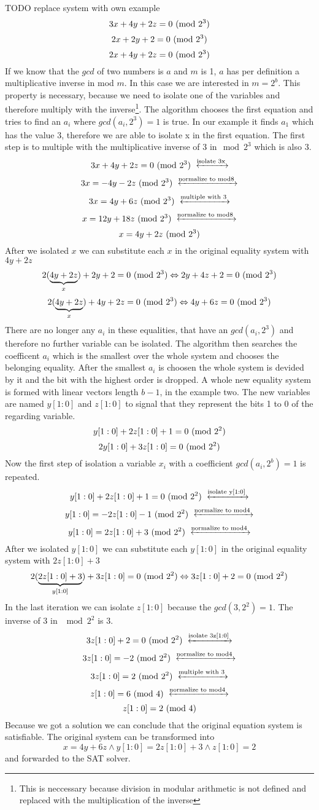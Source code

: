 TODO replace system with own example
$$3x+4y+2z=0 \ (\mathrm{mod}\ 2^3)$$
$$2x+2y+2=0  \ (\mathrm{mod}\ 2^3)$$
$$2x+4y+2z=0 \ (\mathrm{mod}\ 2^3)$$
If we know that the $gcd$ of two numbers is $a$ and $m$ is 1, $a$ has per definition a multiplicative inverse in mod $m$. In this case we are interested in $m=2^b$. This property is necessary, because we need to isolate one of the variables and therefore multiply with the inverse\footnote{This is neccessary because division in modular arithmetic is not defined and replaced with the multiplication of the inverse}.
The algorithm chooses the first equation and tries to find an $a_i$ where $gcd(a_i,2^3) = 1$ is true. In our example it finds $a_1$ which has the value $3$, therefore we are able to isolate x in the first equation.
The first step is to multiple with the multiplicative inverse of 3 in$\mod{2^3}$ which is also 3.
$$3x+4y+2z = 0 \Mod{2^3} \xleftrightarrow{\text{isolate 3x}}$$
$$3x=-4y-2z  \Mod{2^3}   \xleftrightarrow{\text{normalize to mod8}}$$
$$3x=4y+6z  \Mod{2^3}  \xleftrightarrow{\text{multiple with 3}}$$
$$x=12y+18z \Mod{2^3}  \xleftrightarrow{\text{normalize to mod8}}$$
$$x=4y+2z \ (\mathrm{mod}\ 2^3) $$
After we isolated $x$ we can substitute each $x$ in the original equality system with $4y+2z$
$$2(\underbrace{4y+2z}_{x})+2y+2=0 \ (\mathrm{mod}\ 2^3) \Leftrightarrow 2y + 4z + 2 = 0\ (\mathrm{mod}\ 2^3) $$
$$2(\underbrace{4y+2z}_{x})+ 4y + 2z = 0 \ (\mathrm{mod}\ 2^3) \Leftrightarrow 4y + 6z = 0\ (\mathrm{mod}\ 2^3) $$
There are no longer any ${a_i}$ in these equalities, that have an $gcd(a_i,2^3)$ and therefore no further variable can be isolated.
The algorithm then searches the coefficent $a_i$ which is the smallest over the whole system and chooses the belonging equality.
After the smallest $a_i$ is choosen the whole system is devided by it and the bit with the highest order is dropped.
A whole new equality system is formed with linear vectors length $b-1$, in the example two.
The new variables are named $y[1:0]$ and $z[1:0]$ to signal that they represent the bits 1 to 0 of the regarding variable.
$$y[1 : 0] + 2z[1 : 0] + 1 = 0 \ (\mathrm{mod}\ 2^2)$$
$$2y[1 : 0] + 3z[1 : 0] = 0\ (\mathrm{mod}\ 2^2)$$
Now the first step of isolation a variable $x_i$ with a coefficient $gcd(a_i, 2^b)=1$ is repeated.
$$y[1 : 0] + 2z[1 : 0] + 1 = 0 \Mod{2^2} \xleftrightarrow{\text{isolate y[1:0]}}$$
$$y[1 : 0] = -2z[1 : 0] -1 \Mod{2^2} \xleftrightarrow{\text{normalize to mod4}}$$
$$y[1 : 0] = 2z[1 : 0] +3 \Mod{2^2} \xleftrightarrow{\text{normalize to mod4}}$$
After we isolated $y[1 : 0] $ we can substitute each $y[1 : 0] $ in the original equality system with $2z[1:0]+3$
$$2(\underbrace{2z[1:0]+3}_{y[1:0]}) + 3z[1 : 0] = 0\ (\mathrm{mod}\ 2^2)  \Leftrightarrow 3z[1:0] + 2 = 0 \ (\mathrm{mod}\ 2^2)$$
In the last iteration we can isolate $z[1:0]$ because the $gcd(3,2^2) = 1$. The inverse of 3 in $\mod{2^2}$ is 3.
$$3z[1:0] + 2 = 0 \Mod{2^2} \xleftrightarrow{\text{isolate 3z[1:0]}}$$
$$3z[1:0]=-2  \Mod{2^2}   \xleftrightarrow{\text{normalize to mod4}}$$
$$3z[1:0]=2  \Mod{2^2}   \xleftrightarrow{\text{multiple with 3}}$$
$$z[1:0]=6  \Mod{4}  \xleftrightarrow{\text{normalize to mod4}}$$
$$z[1:0]=2  \ (\mathrm{mod}\ 4)$$
Because we got a solution we can conclude that the original equation system is satisfiable.
The original system can be transformed into $$x = 4y + 6z \land y[1 : 0] = 2z[1 : 0] + 3 \land z[1 : 0] = 2$$ and forwarded to the SAT solver.

